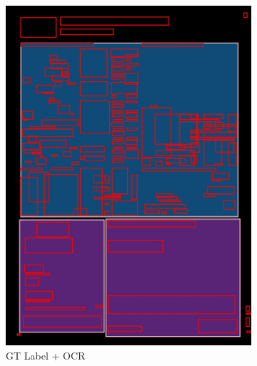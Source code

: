 \documentclass[aspectratio=1610]{beamer}
\begin{document}
\begin{frame}
\begin{figure}
\begin{subfigure}{.25\textwidth}
  \includegraphics[width=0.99\linewidth, clip=true, trim = 0mm 0mm 0mm 0mm]{figures/ocr_bbox/Jd55Bvg.jpg}
  \caption{GT Label + OCR}
\end{subfigure}%
\begin{subfigure}{.25\textwidth}
  \centering

\end{subfigure}
\end{figure}
\end{frame}
\end{document}
